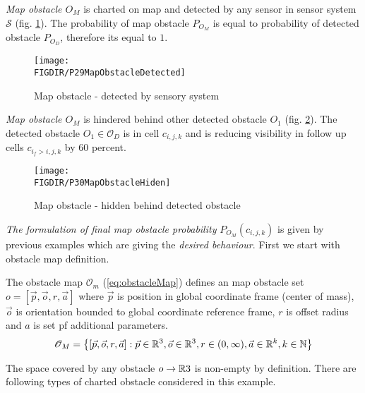 \noindent\emph{Map obstacle $O_M$} is charted on map and detected by any sensor in sensor system $\mathscr{S}$ (fig. \ref{fig:P29MapObstacleDetected}). The probability of map obstacle $P_{O_M}$ is equal to probability of detected obstacle $P_{O_D}$, therefore its equal to $1$.

\begin{figure}[H]
    \centering
    \texttt{[image: \\FIGDIR/P29MapObstacleDetected]}
    \caption{Map obstacle - detected by sensory system}
    \label{fig:P29MapObstacleDetected}
\end{figure}

\noindent\emph{Map obstacle $O_M$} is hindered behind other detected obstacle $O_1$ (fig. \ref{fig:P30MapObstacleHiden}). The detected obstacle $O_1\in\mathscr{O}_D$ is in cell $c_{i,j,k}$ and is reducing visibility in follow up cells $c_{i_f>i,j,k}$ by $60$ percent.
\begin{figure}[H]
    \centering
    \texttt{[image: \\FIGDIR/P30MapObstacleHiden]}
    \caption{Map obstacle - hidden behind detected obstacle}
    \label{fig:P30MapObstacleHiden}
\end{figure}

\noindent\emph{The formulation of final map obstacle probability} $P_{O_M}(c_{i,j,k})$ is given by previous examples which are giving the \emph{desired behaviour}. First we start with obstacle map definition.

The obstacle map $\mathscr{O}_m$ (\ref{eq:obstacleMap}) defines an map obstacle set $o=[\vec{p},\vec{o},r,\vec{a}]$ where $\vec{p}$ is position in global coordinate frame (center of mass), $\vec{o}$ is orientation bounded to global coordinate reference frame, $r$ is offset radius and $a$ is set pf additional parameters.
\begin{equation}\label{eq:obstacleMap}
    \mathscr{O}_M= \left\{[\vec{p},\vec{o},r,\vec{a}]:\vec{p}\in\mathbb{R}^3, \vec{o}\in\mathbb{R}^3, r\in (0,\infty),\vec{a}\in\mathbb{R}^k,k\in\mathbb{N}\right\}
\end{equation}

The space covered by any obstacle $o\to\mathbb{R}3$ is non-empty by definition. There are following types of charted obstacle considered in this example.

